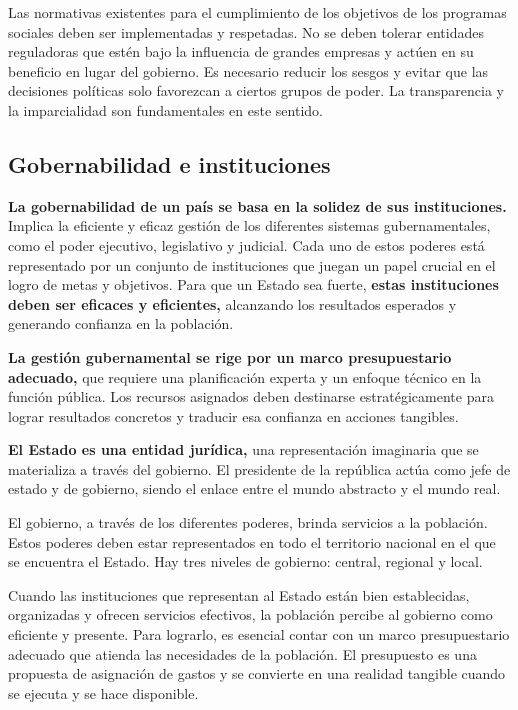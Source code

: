 \documentclass[
  a4paper,
]{article}
\begin{document}
Las normativas existentes para el cumplimiento de los objetivos de los
programas sociales deben ser implementadas y respetadas. No se deben
tolerar entidades reguladoras que estén bajo la influencia de grandes
empresas y actúen en su beneficio en lugar del gobierno. Es necesario
reducir los sesgos y evitar que las decisiones políticas solo favorezcan
a ciertos grupos de poder. La transparencia y la imparcialidad son
fundamentales en este sentido.

\subsection{Gobernabilidad e
instituciones}\label{gobernabilidad-e-instituciones}

\textbf{La gobernabilidad de un país se basa en la solidez de sus
instituciones.} Implica la eficiente y eficaz gestión de los diferentes
sistemas gubernamentales, como el poder ejecutivo, legislativo y
judicial. Cada uno de estos poderes está representado por un conjunto de
instituciones que juegan un papel crucial en el logro de metas y
objetivos. Para que un Estado sea fuerte, \textbf{estas instituciones
deben ser eficaces y eficientes,} alcanzando los resultados esperados y
generando confianza en la población.

\textbf{La gestión gubernamental se rige por un marco presupuestario
adecuado,} que requiere una planificación experta y un enfoque técnico
en la función pública. Los recursos asignados deben destinarse
estratégicamente para lograr resultados concretos y traducir esa
confianza en acciones tangibles.

\textbf{El Estado es una entidad jurídica,} una representación
imaginaria que se materializa a través del gobierno. El presidente de la
república actúa como jefe de estado y de gobierno, siendo el enlace
entre el mundo abstracto y el mundo real.

El gobierno, a través de los diferentes poderes, brinda servicios a la
población. Estos poderes deben estar representados en todo el territorio
nacional en el que se encuentra el Estado. Hay tres niveles de gobierno:
central, regional y local.

Cuando las instituciones que representan al Estado están bien
establecidas, organizadas y ofrecen servicios efectivos, la población
percibe al gobierno como eficiente y presente. Para lograrlo, es
esencial contar con un marco presupuestario adecuado que atienda las
necesidades de la población. El presupuesto es una propuesta de
asignación de gastos y se convierte en una realidad tangible cuando se
ejecuta y se hace disponible.
\end{document}
